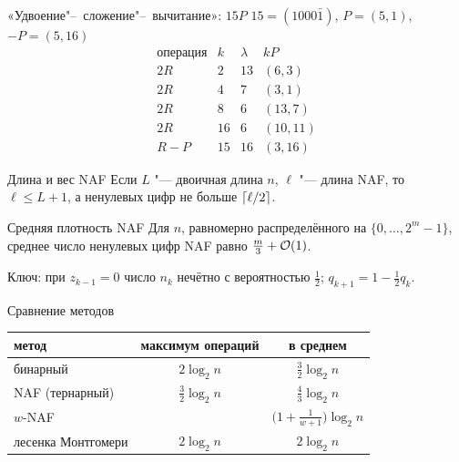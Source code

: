 \documentclass{ca-slides}
\begin{document}
\begin{canvasframe}{«Удвоение"--~сложение"--~вычитание»: $15P$}
  $15 = (1000\bar 1)$, \quad $P = (5, 1)$, \quad $-P = (5, 16)$
  \[
  \begin{array}{l|r|r|c}
    \text{операция} & k & \lambda & kP \\ \hline
    2R    & 2  & 13 & (6, 3)   \\
    2R    & 4  & 7  & (3, 1)   \\
    2R    & 8  & 6  & (13, 7)  \\
    2R    & 16 & 6  & (10, 11) \\
    R - P & 15 & 16 & (3, 16)
  \end{array}
  \]
\end{canvasframe}

\begin{theoremframe}[lemma]{Длина и вес NAF}
  Если $L$ "--- двоичная длина $n$, $\ell$ "--- длина NAF, то $\ell \le L + 1$, а ненулевых цифр
  не больше $\lceil\ell/2\rceil$.
\end{theoremframe}

\begin{theoremframe}{Средняя плотность NAF}
  Для $n$, равномерно распределённого на $\{0, \dots, 2^m - 1\}$, среднее число ненулевых цифр
  NAF равно $\frac m3 + \mathcal{O}(1)$.
  \medskip

  \footnotesize\textcolor{caGray}{Ключ: при $z_{k-1} = 0$ число $n_k$ нечётно с вероятностью
  $\frac12$; $q_{k+1} = 1 - \frac12 q_k$.}
\end{theoremframe}

\begin{canvasframe}{Сравнение методов}
  \begin{center}
  \begin{tabular}{l|c|c}
    метод & максимум операций & в среднем \\ \hline
    бинарный & $2 \log_2 n$ & $\frac32 \log_2 n$ \\
    NAF (тернарный) & $\frac32 \log_2 n$ & $\frac43 \log_2 n$ \\
    $w$-NAF & & $\bigl(1 + \frac1{w+1}\bigr)\log_2 n$ \\
    лесенка Монтгомери & $2 \log_2 n$ & $2 \log_2 n$
  \end{tabular}
  \end{center}
  \penspace[0.25\textheight]
\end{canvasframe}
\end{document}
